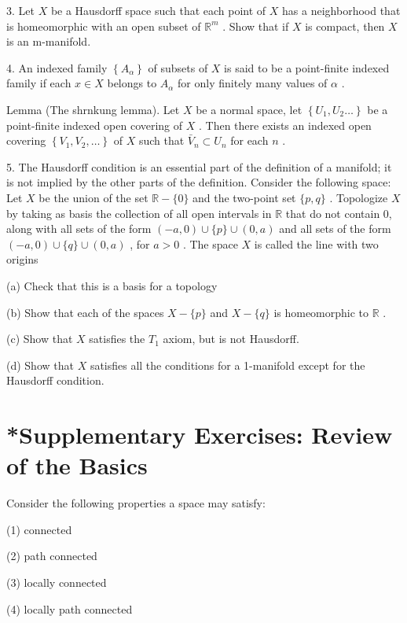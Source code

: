 \documentclass[10pt]{article}
\begin{document}
3. Let \(X\) be a Hausdorff space such that each point of \(X\) has a neighborhood that is homeomorphic with an open subset of \({\mathbb{R}}^{m}\) . Show that if \(X\) is compact, then \(X\) is an m-manifold.

4. An indexed family \(\left\{  {A}_{\alpha }\right\}\) of subsets of \(X\) is said to be a point-finite indexed family if each \(x \in  X\) belongs to \({A}_{\alpha }\) for only finitely many values of \(\alpha\) .

Lemma (The shrnkung lemma). Let \(X\) be a normal space, let \(\left\{  {{U}_{1},{U}_{2}\ldots }\right\}\) be a point-finite indexed open covering of \(X\) . Then there exists an indexed open covering \(\left\{  {{V}_{1},{V}_{2},\ldots }\right\}\) of \(X\) such that \({\bar{V}}_{n} \subset  {U}_{n}\) for each \(n\) .

5. The Hausdorff condition is an essential part of the definition of a manifold; it is not implied by the other parts of the definition. Consider the following space: Let \(X\) be the union of the set \(\mathbb{R} - \{ 0\}\) and the two-point set \(\{ p,q\}\) . Topologize \(X\) by taking as basis the collection of all open intervals in \(\mathbb{R}\) that do not contain 0, along with all sets of the form \(\left( {-a,0}\right)  \cup  \{ p\}  \cup  \left( {0,a}\right)\) and all sets of the form \(\left( {-a,0}\right)  \cup  \{ q\}  \cup  \left( {0,a}\right)\) , for \(a > 0\) . The space \(X\) is called the line with two origins

(a) Check that this is a basis for a topology

(b) Show that each of the spaces \(X - \{ p\}\) and \(X - \{ q\}\) is homeomorphic to \(\mathbb{R}\) .

(c) Show that \(X\) satisfies the \({T}_{1}\) axiom, but is not Hausdorff.

(d) Show that \(X\) satisfies all the conditions for a 1-manifold except for the Hausdorff condition.

\section*{*Supplementary Exercises: Review of the Basics}

Consider the following properties a space may satisfy:

(1) connected

(2) path connected

(3) locally connected

(4) locally path connected
\end{document}
